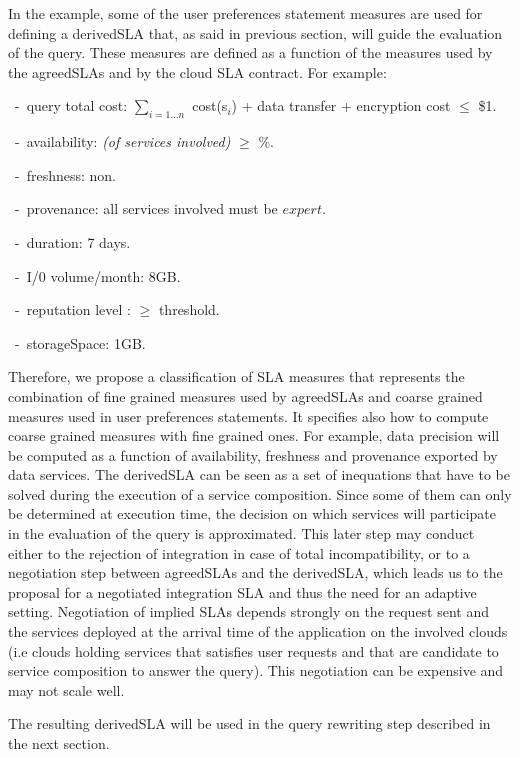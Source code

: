 In the example, some of the user preferences statement measures are used for defining a derivedSLA that, as said in previous section, will guide the evaluation of the query. 
These measures are defined as a function of the measures used by the agreedSLAs and by the cloud SLA contract. For example: 
\begin{trivlist}\sf\footnotesize
 \item[~-~query total cost:] $\sum_{i = 1\dots n}$ cost(s$_i$) + data transfer + encryption cost $\leq$ \$1.
 \item[~-~availability:] {\em (of services involved)} $\geq$ {$\%$}.
 \item[~-~freshness:] non.
 \item[~-~provenance:] all services involved must be $expert$.
 \item[~-~duration:] 7 days.
 \item[~-~I/0 volume/month:] 8GB.
 \item[~-~reputation level :] $\geq$ threshold.
 \item[~-~storageSpace:] 1GB.
 \end{trivlist} 
 
Therefore, we propose a classification of SLA measures that represents the combination of fine grained measures used by agreedSLAs and coarse grained measures used in user preferences statements. 
It specifies also how to compute coarse grained measures with fine grained ones. 
For example, data precision will be computed as a function of availability, freshness and provenance exported by data services. The derivedSLA can be seen as a set of inequations that have to be solved during the execution of a service composition. Since some of them can only be determined at execution time, the decision on which services will participate in the evaluation of the query is approximated.  
This later step may conduct either to the rejection of integration in case of total incompatibility, or to a negotiation step between agreedSLAs and the derivedSLA, which  leads us to the proposal for a negotiated integration SLA  and thus the need for an adaptive setting.
Negotiation of implied SLAs depends strongly on the request sent and the services deployed at the arrival time of the application on the involved  clouds (i.e clouds holding services that satisfies user requests and that are candidate to service composition to answer the query). This negotiation can be expensive and may not scale well.
 
The resulting derivedSLA will be used in the query rewriting step described in the next section. 
 
